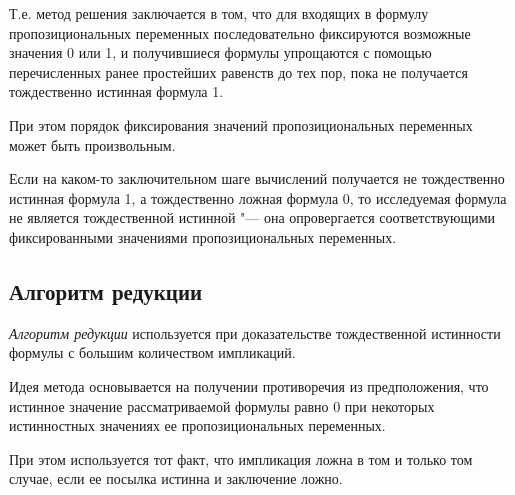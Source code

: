 Т.е. метод решения заключается в том, что для входящих в формулу пропозициональных переменных последовательно фиксируются возможные значения 0 или 1, и получившиеся формулы упрощаются с помощью перечисленных ранее простейших равенств до тех пор, пока не получается тождественно истинная формула 1.

При этом порядок фиксирования значений пропозициональных переменных может быть произвольным.

\begin{remark}
    Если на каком-то заключительном шаге вычислений получается не тождественно истинная формула 1, а тождественно ложная формула 0, то исследуемая формула не является тождественной истинной "--- она опровергается соответствующими фиксированными значениями пропозициональных переменных. 
\end{remark}

\subsection*{Алгоритм редукции}
\textit{Алгоритм редукции} используется при доказательстве тождественной истинности формулы с большим количеством импликаций. 

Идея метода основывается на получении противоречия из предположения, что истинное значение рассматриваемой формулы равно 0 при некоторых истинностных значениях ее пропозициональных переменных. 

При этом используется тот факт, что импликация ложна в том и только том случае, если ее посылка истинна и заключение ложно. 

